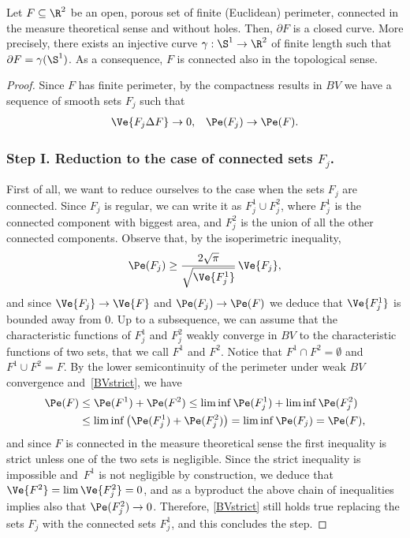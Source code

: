 \begin{lem}\label{noislPCC}
Let $F\subseteq\R^2$ be an open, porous set of finite (Euclidean) perimeter, connected in the measure theoretical sense and without holes. Then, $\partial F$ is a closed curve. More precisely, there exists an injective curve $\gamma:\S^1\to\R^2$ of finite length such that $\partial F=\gamma(\S^1)$. As a consequence, $F$ is connected also in the topological sense.
\end{lem}
\begin{proof}
Since $F$ has finite perimeter, by the compactness results in $BV$ we have a sequence of smooth sets $F_j$ such that
\begin{align}\label{BVstrict}
\Ve{F_j\Delta F} \to 0, && \Pe(F_j) \to \Pe(F).
\end{align}

\subsubsection*{Step I. Reduction to the case of connected sets $F_j$.}
First of all, we want to reduce ourselves to the case when the sets $F_j$ are connected. Since $F_j$ is regular, we can write it as $F_j^1\cup F_j^2$, where $F_j^1$ is the connected component with biggest area, and $F_j^2$ is the union of all the other connected components. Observe that, by the isoperimetric inequality,
\[
\Pe(F_j) \geq \frac{2 \sqrt{\pi}}{\sqrt{\Ve{F_j^1}}}\, \Ve{F_j},
\]
and since $\Ve{F_j}\to \Ve{F}$ and $\Pe(F_j)\to \Pe(F)$ we deduce that $\Ve{F_j^1}$ is bounded away from $0$. Up to a subsequence, we can assume that the characteristic functions of $F_j^1$ and $F_j^2$ weakly converge in $BV$ to the characteristic functions of two sets, that we call $F^1$ and $F^2$. Notice that $F^1\cap F^2=\emptyset$ and $F^1\cup F^2=F$. By the lower semicontinuity of the perimeter under weak $BV$ convergence and~\eqref{BVstrict}, we have
\[\begin{split}
\Pe(F) &\leq \Pe(F^1)+\Pe(F^2) \leq \liminf \Pe(F_j^1) + \liminf \Pe(F_j^2)\\
&\leq \liminf \big(\Pe(F_j^1)+\Pe(F_j^2)\big) = \liminf \Pe(F_j) = \Pe(F),
\end{split}\]
and since $F$ is connected in the measure theoretical sense the first inequality is strict unless one of the two sets is negligible. Since the strict inequality is impossible and~$F^1$ is not negligible by construction, we deduce that $\Ve{F^2}=\lim \Ve{F^2_j}=0$, and as a byproduct the above chain of inequalities implies also that $\Pe(F^2_j)\to 0$. Therefore, \eqref{BVstrict} still holds true replacing the sets $F_j$ with the connected sets $F_j^1$, and this concludes the step.


\end{proof}
